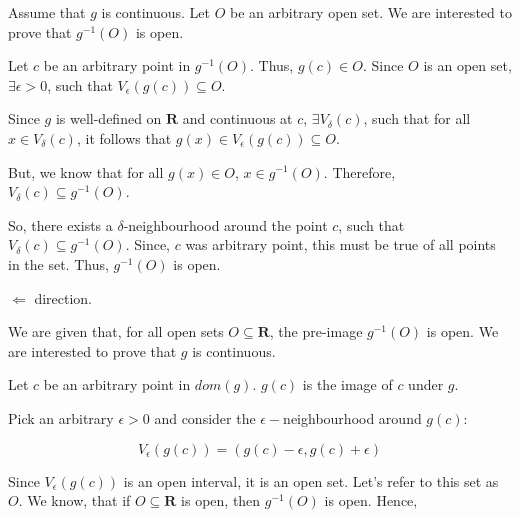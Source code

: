 \documentclass[10pt]{article}
\begin{document}
Assume that $\displaystyle g$ is continuous. Let $\displaystyle O$ be an arbitrary open set. We are interested to prove that $\displaystyle g^{-1}( O)$ is open.



Let $\displaystyle c$ be an arbitrary point in $\displaystyle g^{-1}( O)$. Thus, $\displaystyle g( c) \in O$. Since $\displaystyle O$ is an open set, $\displaystyle \exists \epsilon  >0$, such that $\displaystyle V_{\epsilon }( g( c)) \subseteq O$.



Since $\displaystyle g$ is well-defined on $\displaystyle \mathbf{R}$ and continuous at $\displaystyle c$, $\displaystyle \exists V_{\delta }( c)$, such that for all $\displaystyle x\in V_{\delta }( c)$, it follows that $\displaystyle g( x) \in V_{\epsilon }( g( c)) \subseteq O$. 



But, we know that for all $\displaystyle g( x) \in O$, $\displaystyle x\in g^{-1}( O)$. Therefore, $\displaystyle V_{\delta }( c) \subseteq g^{-1}( O)$. 



So, there exists a $\displaystyle \delta $-neighbourhood around the point $\displaystyle c$, such that $\displaystyle V_{\delta }( c) \subseteq g^{-1}( O)$. Since, $\displaystyle c$ was arbitrary point, this must be true of all points in the set. Thus, $\displaystyle g^{-1}( O)$ is open.



$\displaystyle \Longleftarrow $ direction. 



We are given that, for all open sets $\displaystyle O\subseteq \mathbf{R}$, the pre-image $\displaystyle g^{-1}( O)$ is open. We are interested to prove that $\displaystyle g$ is continuous.



Let $\displaystyle c$ be an arbitrary point in $\displaystyle dom( g)$. $\displaystyle g( c)$ is the image of $\displaystyle c$ under $\displaystyle g$.



Pick an arbitrary $\displaystyle \epsilon  >0$ and consider the $\displaystyle \epsilon -$neighbourhood around $\displaystyle g( c)$:


\begin{equation*}
V_{\epsilon }( g( c)) =( g( c) -\epsilon ,g( c) +\epsilon )
\end{equation*}


Since $\displaystyle V_{\epsilon }( g( c))$ is an open interval, it is an open set. Let's refer to this set as $\displaystyle O$. We know, that if $\displaystyle O\subseteq \mathbf{R}$ is open, then $\displaystyle g^{-1}( O)$ is open. Hence,
\end{document}
